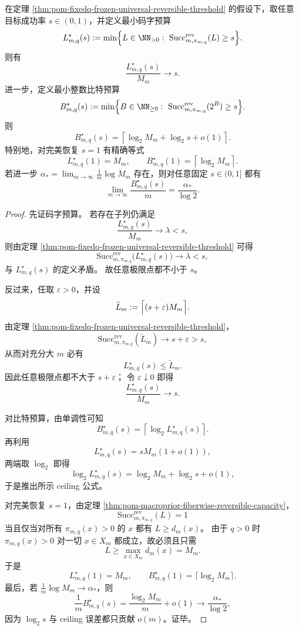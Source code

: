\begin{corollary}[固定温度冻结区中的最小码字预算与最小比特预算]\label{cor:pom-fixedq-frozen-minimal-reversible-budget}
在定理 \ref{thm:pom-fixedq-frozen-universal-reversible-threshold} 的假设下，取任意目标成功率 \(s\in(0,1)\)，并定义最小码字预算
\[
L^\star_{m,q}(s)
:=
\min\Bigl\{L\in\NN_{>0}:\ \mathrm{Succ}^{\mathrm{rev}}_{m,\pi_{m,q}}(L)\ge s\Bigr\}.
\]
则有
\[
\boxed{\;
\frac{L^\star_{m,q}(s)}{M_m}\longrightarrow s.
\;}
\]
进一步，定义最小整数比特预算
\[
B^\star_{m,q}(s)
:=
\min\Bigl\{B\in\NN_{\ge 0}:\ \mathrm{Succ}^{\mathrm{rev}}_{m,\pi_{m,q}}(2^B)\ge s\Bigr\}.
\]
则
\[
\boxed{\;
B^\star_{m,q}(s)
=
\left\lceil
\log_2 M_m+\log_2 s+o(1)
\right\rceil .
\;}
\]
特别地，对完美恢复 \(s=1\) 有精确等式
\[
L^\star_{m,q}(1)=M_m,
\qquad
B^\star_{m,q}(1)=\left\lceil \log_2 M_m\right\rceil.
\]
若进一步 \(\alpha_\ast=\lim_{m\to\infty}\frac{1}{m}\log M_m\) 存在，则对任意固定 \(s\in(0,1]\) 都有
\[
\lim_{m\to\infty}\frac{B^\star_{m,q}(s)}{m}
=
\frac{\alpha_\ast}{\log 2}.
\]
\end{corollary}
\begin{proof}
先证码字预算。
若存在子列仍满足
\[
\frac{L^\star_{m,q}(s)}{M_m}\longrightarrow \lambda<s,
\]
则由定理 \ref{thm:pom-fixedq-frozen-universal-reversible-threshold} 可得
\[
\mathrm{Succ}^{\mathrm{rev}}_{m,\pi_{m,q}}\bigl(L^\star_{m,q}(s)\bigr)\longrightarrow \lambda<s,
\]
与 \(L^\star_{m,q}(s)\) 的定义矛盾。
故任意极限点都不小于 \(s\)。
\par
反过来，任取 \(\varepsilon>0\)，并设
\[
\widetilde L_m:=\Bigl\lceil (s+\varepsilon)M_m\Bigr\rceil.
\]
由定理 \ref{thm:pom-fixedq-frozen-universal-reversible-threshold}，
\[
\mathrm{Succ}^{\mathrm{rev}}_{m,\pi_{m,q}}(\widetilde L_m)\longrightarrow s+\varepsilon>s,
\]
从而对充分大 \(m\) 必有
\[
L^\star_{m,q}(s)\le \widetilde L_m.
\]
因此任意极限点都不大于 \(s+\varepsilon\)；
令 \(\varepsilon\downarrow 0\) 即得
\[
\frac{L^\star_{m,q}(s)}{M_m}\to s.
\]
\par
对比特预算，由单调性可知
\[
B^\star_{m,q}(s)=\left\lceil \log_2 L^\star_{m,q}(s)\right\rceil.
\]
再利用
\[
L^\star_{m,q}(s)=sM_m(1+o(1)),
\]
两端取 \(\log_2\) 即得
\[
\log_2 L^\star_{m,q}(s)=\log_2 M_m+\log_2 s+o(1),
\]
于是推出所示 ceiling 公式。
\par
对完美恢复 \(s=1\)，由定理 \ref{thm:pom-macroprior-fiberwise-reversible-capacity}，
\[
\mathrm{Succ}^{\mathrm{rev}}_{m,\pi_{m,q}}(L)=1
\]
当且仅当对所有 \(\pi_{m,q}(x)>0\) 的 \(x\) 都有 \(L\ge d_m(x)\)。
由于 \(q>0\) 时 \(\pi_{m,q}(x)>0\) 对一切 \(x\in X_m\) 都成立，故必须且只需
\[
L\ge \max_{x\in X_m}d_m(x)=M_m.
\]
于是
\[
L^\star_{m,q}(1)=M_m,
\qquad
B^\star_{m,q}(1)=\lceil \log_2 M_m\rceil.
\]
最后，若 \(\frac1m\log M_m\to\alpha_\ast\)，则
\[
\frac{1}{m}B^\star_{m,q}(s)
=
\frac{\log_2 M_m}{m}+o(1)
\to
\frac{\alpha_\ast}{\log 2},
\]
因为 \(\log_2 s\) 与 ceiling 误差都只贡献 \(o(m)\)。证毕。
\end{proof}

